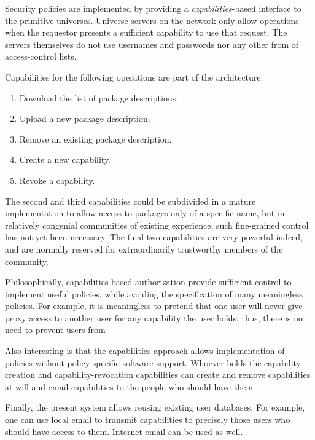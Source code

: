 \documentclass{IEEEtran}
\begin{document}
Security policies are implemented by providing a
\emph{capabilities}-based interface to the primitive universes.
Universe servers on the network only allow operations when the
requestor presents a sufficient capability to use that request.  The
servers themselves do not use usernames and passwords nor any other
from of access-control lists.

Capabilities for the following operations are part of the architecture:
\begin{enumerate}
\item Download the list of package descriptions.
\item Upload a new package description.
\item Remove an existing package description.
\item Create a new capability.
\item Revoke a capability.
\end{enumerate}
The second and third capabilities could be subdivided in a mature
implementation to allow access to packages only of a specific name,
but in relatively congenial communities of existing experience, such
fine-grained control has not yet been necessary.  The final two
capabilities are very powerful indeed, and are normally reserved for
extraordinarily trustworthy members of the community.



Philosophically, capabilities-based authorization provide sufficient
control to implement useful policies, while avoiding the specification
of many meaningless policies.  For example, it is meaningless to
pretend that one user will never give proxy access to another user for
any capability the user holds; thus, there is no need to prevent users from

Also interesting is that the capabilities approach allows
implementation of policies without policy-specific software support.
Whoever holds the capability-creation and capability-revocation
capabilities can create and remove capabilities at will and email
capabilities to the people who should have them.

Finally, the present system allows reusing existing user databases.
For example, one can use local email to transmit capabilities to
precisely those users who should have access to them.  Internet email
can be used as well.



  
\end{document}

